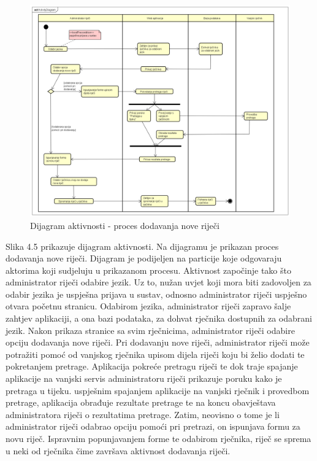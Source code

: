 			
			
			\begin{figure}[H]
				\includegraphics[width=\textwidth]{slike/ActivityDiagram.PNG}
				\caption{Dijagram aktivnosti - proces dodavanja nove riječi}
				\label{fig:activityDiagram}
			\end{figure}
			
			\newpage
			
			Slika 4.5 prikazuje dijagram aktivnosti. Na dijagramu je prikazan proces dodavanja nove riječi. Dijagram je podijeljen na particije koje odgovaraju aktorima koji sudjeluju u prikazanom procesu. Aktivnost započinje tako što administrator riječi odabire jezik. Uz to, nužan uvjet koji mora biti zadovoljen za odabir jezika je uspješna prijava u sustav, odnosno administrator riječi uspješno otvara početnu stranicu. Odabirom jezika, administrator riječi zapravo šalje zahtjev aplikaciji, a ona bazi podataka, za dohvat rječnika dostupnih za odabrani jezik. Nakon prikaza stranice sa svim rječnicima, administrator riječi odabire opciju dodavanja nove riječi. Pri dodavanju nove riječi, administrator riječi može potražiti pomoć od vanjskog rječnika upisom dijela riječi koju bi želio dodati te pokretanjem pretrage. Aplikacija pokreće pretragu riječi te dok traje spajanje aplikacije na vanjski servis administratoru riječi prikazuje poruku kako je pretraga u tijeku. uspješnim spajanjem aplikacije na vanjski rječnik i provedbom pretrage, aplikacija obrađuje rezultate pretrage te na koncu obavještava administratora riječi o rezultatima pretrage. Zatim, neovisno o tome je li administrator riječi odabrao opciju pomoći pri pretrazi, on ispunjava formu za novu riječ. Ispravnim popunjavanjem forme te odabirom rječnika, riječ se sprema u neki od rječnika čime završava aktivnost dodavanja riječi.
			

